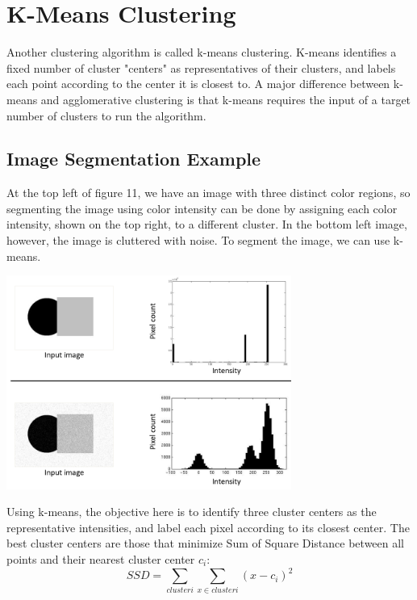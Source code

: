 \documentclass{article}
\begin{document}
\section{K-Means Clustering}
Another clustering algorithm is called k-means clustering. K-means identifies a fixed number of cluster "centers" as representatives of their clusters, and labels each point according to the center it is closest to. A major difference between k-means and agglomerative clustering is that k-means requires the input of a target number of clusters to run the algorithm.
\subsection{Image Segmentation Example}
At the top left of figure 11, we have an image with three distinct color regions, so segmenting the image using color intensity can be done by assigning each color intensity, shown on the top right, to a different cluster. In the bottom left image, however, the image is cluttered with noise. To segment the image, we can use k-means.

\begin{minipage}{\linewidth}
\begin{center}
\includegraphics[width=0.70\textwidth]{k-means-example.png}
\end{center}
\end{minipage}

Using k-means, the objective here is to identify three cluster centers as the representative intensities, and label each pixel according to its closest center. The best cluster centers are those that minimize Sum of Square Distance between all points and their nearest cluster center $c_i$:
\begin{equation}
SSD = \sum_{cluster i}\sum_{x \in cluster i}(x-c_i)^2
\end{equation}
\end{document}
